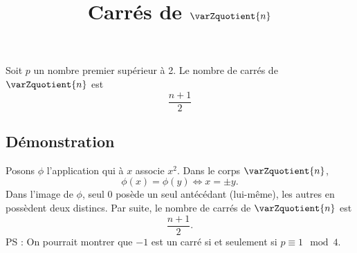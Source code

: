 \documentclass[fontsize=12pt,twoside=false,parskip=half]{scrartcl}
\title{Carrés de $\varZquotient{n}$}
\date{}
\author{}
\begin{document}
\maketitle
   \begin{Theoreme}
      Soit $p$ un nombre premier supérieur à 2. Le nombre de carrés de $\varZquotient{n}$ est
      \[
         \frac{n + 1}{2}
      \]
   \end{Theoreme}
   \subsection{Démonstration}
      Posons $\phi$ l’application qui à $x$ associe $x^2$. Dans le corps $\varZquotient{n}$,
      \[
         \phi(x) = \phi(y) \iff x = \pm y.
      \]
      Dans l’image de $\phi$, seul $0$ posède un seul antécédant (lui-même), les autres en possèdent deux distincs. Par suite, 
      le nombre de carrés de $\varZquotient{n}$ est
      \[
         \frac{n + 1}{2}.
      \]
      PS : On pourrait montrer que $-1$ est un carré si et seulement si $p \equiv 1 \mod 4$.
\end{document}
